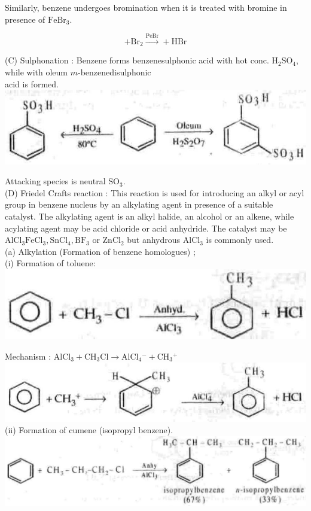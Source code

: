 \documentclass[10pt]{article}
\begin{document}
Similarly, benzene undergoes bromination when it is treated with bromine in presence of $\mathrm{FeBr}_{3}$.

$$
+\mathrm{Br}_{2} \xrightarrow{\mathrm{PeBr}}+\mathrm{HBr}
$$

(C) Sulphonation : Benzene forms benzenesulphonic acid with hot conc. $\mathrm{H}_{2} \mathrm{SO}_{4}$, while with oleum $m$-benzenedisulphonic\\
acid is formed.\\
\includegraphics[max width=\textwidth, center]{2025_01_28_8470952b98110cec3aabg-208}

Attacking species is neutral $\mathrm{SO}_{3}$.\\
(D) Friedel Crafts reaction : This reaction is used for introducing an alkyl or acyl group in benzene nucleus by an alkylating agent in presence of a suitable catalyst. The alkylating agent is an alkyl halide, an alcohol or an alkene, while acylating agent may be acid chloride or acid anhydride. The catalyst may be $\mathrm{AlCl}_{3} \mathrm{FeCl}_{3}, \mathrm{SnCl}_{4}, \mathrm{BF}_{3}$ or $\mathrm{ZnCl}_{2}$ but anhydrous $\mathrm{AlCl}_{3}$ is commonly used.\\
(a) Alkylation (Formation of benzene homologues) ;\\
(i) Formation of toluene:\\
\includegraphics[max width=\textwidth, center]{2025_01_28_8470952b98110cec3aabg-208(2)}

Mechanism : $\mathrm{AlCl}_{3}+\mathrm{CH}_{3} \mathrm{Cl} \longrightarrow \mathrm{AlCl}_{4}{ }^{-}+\mathrm{CH}_{3}{ }^{+}$\\
\includegraphics[max width=\textwidth, center]{2025_01_28_8470952b98110cec3aabg-208(1)}\\
(ii) Formation of cumene (isopropyl benzene).\\
\includegraphics[max width=\textwidth, center]{2025_01_28_8470952b98110cec3aabg-208(6)}
\end{document}
